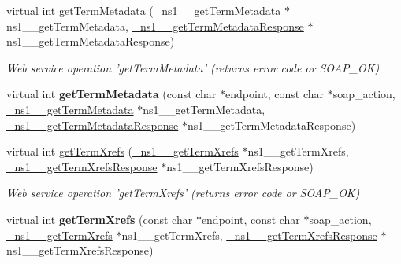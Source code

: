 \begin{DoxyCompactItemize}
\item 
\hypertarget{classOntologyQuerySoapBindingProxy_a9e5fc5322d60496eef2d1a278fe65a71}{
virtual int \hyperlink{classOntologyQuerySoapBindingProxy_a9e5fc5322d60496eef2d1a278fe65a71}{getTermMetadata} (\hyperlink{class__ns1____getTermMetadata}{\_\-ns1\_\-\_\-getTermMetadata} $\ast$ns1\_\-\_\-getTermMetadata, \hyperlink{class__ns1____getTermMetadataResponse}{\_\-ns1\_\-\_\-getTermMetadataResponse} $\ast$ns1\_\-\_\-getTermMetadataResponse)}
\label{classOntologyQuerySoapBindingProxy_a9e5fc5322d60496eef2d1a278fe65a71}

\begin{DoxyCompactList}\small\item\em Web service operation 'getTermMetadata' (returns error code or SOAP\_\-OK) \end{DoxyCompactList}\item 
\hypertarget{classOntologyQuerySoapBindingProxy_a6ff16077859535caa11a1bf079b4179e}{
virtual int {\bfseries getTermMetadata} (const char $\ast$endpoint, const char $\ast$soap\_\-action, \hyperlink{class__ns1____getTermMetadata}{\_\-ns1\_\-\_\-getTermMetadata} $\ast$ns1\_\-\_\-getTermMetadata, \hyperlink{class__ns1____getTermMetadataResponse}{\_\-ns1\_\-\_\-getTermMetadataResponse} $\ast$ns1\_\-\_\-getTermMetadataResponse)}
\label{classOntologyQuerySoapBindingProxy_a6ff16077859535caa11a1bf079b4179e}

\item 
\hypertarget{classOntologyQuerySoapBindingProxy_a6799413a4fb8ee397c33e1e11c2a984f}{
virtual int \hyperlink{classOntologyQuerySoapBindingProxy_a6799413a4fb8ee397c33e1e11c2a984f}{getTermXrefs} (\hyperlink{class__ns1____getTermXrefs}{\_\-ns1\_\-\_\-getTermXrefs} $\ast$ns1\_\-\_\-getTermXrefs, \hyperlink{class__ns1____getTermXrefsResponse}{\_\-ns1\_\-\_\-getTermXrefsResponse} $\ast$ns1\_\-\_\-getTermXrefsResponse)}
\label{classOntologyQuerySoapBindingProxy_a6799413a4fb8ee397c33e1e11c2a984f}

\begin{DoxyCompactList}\small\item\em Web service operation 'getTermXrefs' (returns error code or SOAP\_\-OK) \end{DoxyCompactList}\item 
\hypertarget{classOntologyQuerySoapBindingProxy_ab0b2949752c66e3c953212ce7c99f427}{
virtual int {\bfseries getTermXrefs} (const char $\ast$endpoint, const char $\ast$soap\_\-action, \hyperlink{class__ns1____getTermXrefs}{\_\-ns1\_\-\_\-getTermXrefs} $\ast$ns1\_\-\_\-getTermXrefs, \hyperlink{class__ns1____getTermXrefsResponse}{\_\-ns1\_\-\_\-getTermXrefsResponse} $\ast$ns1\_\-\_\-getTermXrefsResponse)}
\label{classOntologyQuerySoapBindingProxy_ab0b2949752c66e3c953212ce7c99f427}


\end{DoxyCompactItemize}
